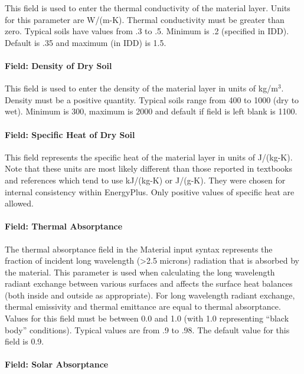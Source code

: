 This field is used to enter the thermal conductivity of the material layer. Units for this parameter are W/(m-K). Thermal conductivity must be greater than zero. Typical soils have values from .3 to .5. Minimum is .2 (specified in IDD). Default is .35 and maximum (in IDD) is 1.5.

\paragraph{Field: Density of Dry Soil}\label{field-density-of-dry-soil}

This field is used to enter the density of the material layer in units of kg/m\(^{3}\). Density must be a positive quantity. Typical soils range from 400 to 1000 (dry to wet). Minimum is 300, maximum is 2000 and default if field is left blank is 1100.

\paragraph{Field: Specific Heat of Dry Soil}\label{field-specific-heat-of-dry-soil}

This field represents the specific heat of the material layer in units of J/(kg-K). Note that these units are most likely different than those reported in textbooks and references which tend to use kJ/(kg-K) or J/(g-K). They were chosen for internal consistency within EnergyPlus. Only positive values of specific heat are allowed.

\paragraph{Field: Thermal Absorptance}\label{field-thermal-absorptance-2}

The thermal absorptance field in the Material input syntax represents the fraction of incident long wavelength (>2.5 microns) radiation that is absorbed by the material. This parameter is used when calculating the long wavelength radiant exchange between various surfaces and affects the surface heat balances (both inside and outside as appropriate). For long wavelength radiant exchange, thermal emissivity and thermal emittance are equal to thermal absorptance. Values for this field must be between 0.0 and 1.0 (with 1.0 representing ``black body'' conditions). Typical values are from .9 to .98. The default value for this field is 0.9.

\paragraph{Field: Solar Absorptance}\label{field-solar-absorptance-2}


